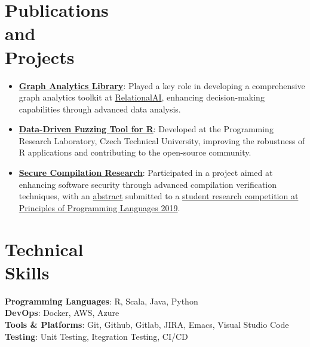 \documentclass[margin,line]{resume}
\newcommand\mymedskip{10pt}
\begin{document}
\begin{resume}
    \section{\mysidestyle Publications \\and \\Projects}
    \begin{itemize}
        \item \href{https://docs.relational.ai/preview/graph-analytics/overview}{\textbf{Graph Analytics Library}}: Played a key role in developing a comprehensive graph analytics toolkit at \href{https://relational.ai/}{RelationalAI}, enhancing decision-making capabilities through advanced data analysis.
        \item \href{https://github.com/PRL-PRG/sle22-signatr-artifact}{\textbf{Data-Driven Fuzzing Tool for R}}: Developed at the Programming Research Laboratory, Czech Technical University, improving the robustness of R applications and contributing to the open-source community.
        \item \href{https://www.khoury.northeastern.edu/research_projects/shf-small-secure-compilation-of-advanced-languages/}{\textbf{Secure Compilation Research}}: Participated in a project aimed at enhancing software security through advanced compilation verification techniques, with an \href{https://github.com/hyeyoungshin/popl19src/blob/master/popl19src.pdf}{abstract} submitted to a \href{https://popl19.sigplan.org/track/POPL-2019-Student-Research-Competition?}{student research competition at Principles of Programming Languages 2019}.
    \end{itemize}

    
    \section{\mysidestyle Technical\\Skills}
    \textbf{Programming Languages}: R, Scala, Java, Python\\[\mymedskip]
    \textbf{DevOps}: Docker, AWS, Azure\\[\mymedskip]
    \textbf{Tools \& Platforms}: Git, Github, Gitlab, JIRA, Emacs, Visual Studio Code\\[\mymedskip]
    \textbf{Testing}: Unit Testing, Itegration Testing, CI/CD
    


\end{resume}
\end{document}
